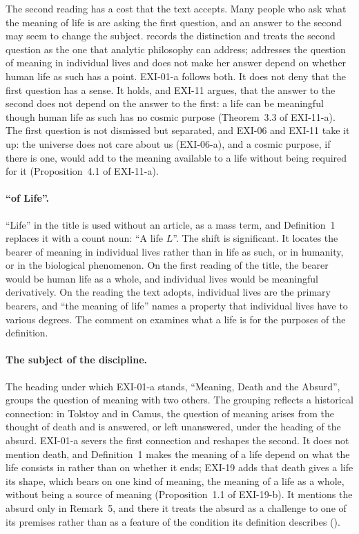 The second reading has a cost that the text accepts. Many people who ask what the meaning of life is are asking the first question, and an answer to the second may seem to change the subject. \citet{Metz2013} records the distinction and treats the second question as the one that analytic philosophy can address; \citet{Wolf2010} addresses the question of meaning in individual lives and does not make her answer depend on whether human life as such has a point. EXI-01-a follows both. It does not deny that the first question has a sense. It holds, and EXI-11 argues, that the answer to the second does not depend on the answer to the first: a life can be meaningful though human life as such has no cosmic purpose (Theorem~3.3 of EXI-11-a). The first question is not dismissed but separated, and EXI-06 and EXI-11 take it up: the universe does not care about us (EXI-06-a), and a cosmic purpose, if there is one, would add to the meaning available to a life without being required for it (Proposition~4.1 of EXI-11-a).

\paragraph{\enquote{of Life}.} \enquote{Life} in the title is used without an article, as a mass term, and Definition~1 replaces it with a count noun: \enquote{A life $L$}. The shift is significant. It locates the bearer of meaning in individual lives rather than in life as such, or in humanity, or in the biological phenomenon. On the first reading of the title, the bearer would be human life as a whole, and individual lives would be meaningful derivatively. On the reading the text adopts, individual lives are the primary bearers, and \enquote{the meaning of life} names a property that individual lives have to various degrees. The comment on  examines what a life is for the purposes of the definition.

\paragraph{The subject of the discipline.} The heading under which EXI-01-a stands, \enquote{Meaning, Death and the Absurd}, groups the question of meaning with two others. The grouping reflects a historical connection: in Tolstoy and in Camus, the question of meaning arises from the thought of death and is answered, or left unanswered, under the heading of the absurd. EXI-01-a severs the first connection and reshapes the second. It does not mention death, and Definition~1 makes the meaning of a life depend on what the life consists in rather than on whether it ends; EXI-19 adds that death gives a life its shape, which bears on one kind of meaning, the meaning of a life as a whole, without being a source of meaning (Proposition~1.1 of EXI-19-b). It mentions the absurd only in Remark~5, and there it treats the absurd as a challenge to one of its premises rather than as a feature of the condition its definition describes ().

